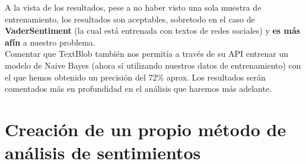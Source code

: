 \documentclass[a4paper,12pt]{report}
\begin{document}
\vspace{2mm}
\begin{table}[htbp!]
\centering
{}
\caption{Resultados para TextBlob}
\end{table}

A la vista de los resultados, pese a no haber visto una sola muestra de entrenamiento, los resultados son aceptables, sobretodo en el caso de \textbf{VaderSentiment} (la cual está entrenada con textos de redes sociales) y \textbf{es más afín} a nuestro problema.
\vspace{2mm}\\
Comentar que TextBlob también nos permitía a través de su API entrenar un modelo de Naive Bayes (ahora sí utilizando nuestros datos de entrenamiento) con el que hemos obtenido un precisión del 72\% aprox. Los resultados serán comentados más en profundidad en el análisis que haremos más adelante. 

\clearpage

\section{Creación de un propio método de análisis de sentimientos}
\end{document}
